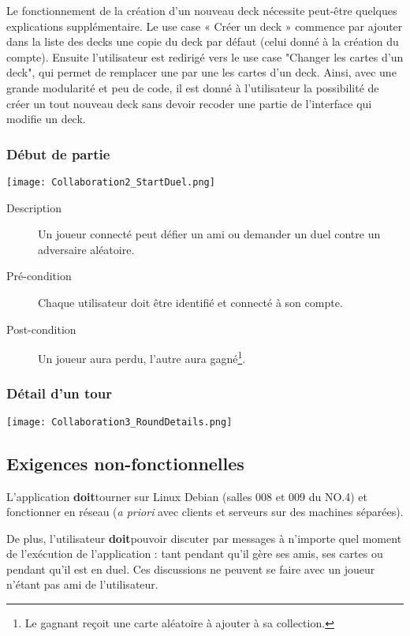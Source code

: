 \documentclass[12pt]{article}
\let\simplesubsection\subsection
\renewcommand{\subsection}{
	\needspace{0.5\pagetotal}
	\simplesubsection
}
\newcommand{\doit}{\textbf{doit}}
\begin{document}
			Le fonctionnement de la création d'un nouveau \gls{deck} nécessite peut-être quelques explications
			supplémentaire. 
			Le use case « Créer un \gls{deck} » commence par ajouter dans la liste des \glspl{deck}
			une copie du \gls{deck} par défaut (celui donné à la création du compte). Ensuite l'utilisateur
			est redirigé vers le use case "Changer les cartes d'un \gls{deck}", qui permet de remplacer
			une par une les cartes d'un \gls{deck}. 
			Ainsi, avec une grande modularité et peu de code,
			il est donné à l'utilisateur la possibilité de créer un tout nouveau \gls{deck} sans devoir recoder une partie
			de l'interface qui modifie un \gls{deck}.

		\subsubsection{Début de partie}
			\begin{center}\texttt{[image: Collaboration2\_StartDuel.png]}\end{center}

			\begin{description}
				\item[Description] Un joueur connecté peut défier un ami ou demander un \gls{duel} contre un adversaire aléatoire.
				\item[Pré-condition] Chaque utilisateur doit être identifié et connecté à son compte.
				\item[Post-condition] Un joueur aura perdu, l'autre aura gagné\footnote{Le gagnant reçoit une carte aléatoire à ajouter à sa collection.}.
			\end{description}

		\subsubsection{Détail d'un tour}
			\begin{center}\texttt{[image: Collaboration3\_RoundDetails.png]}\end{center}

	\subsection{Exigences non-fonctionnelles}
		L'application \doit tourner sur Linux Debian (salles 008 et 009 du NO.4) et fonctionner en réseau (\textit{a priori} avec clients
		et serveurs sur des machines séparées).

		De plus, l'utilisateur \doit pouvoir discuter par messages à n'importe quel moment de l'exécution de l'application : tant pendant
		qu'il gère ses amis, ses cartes ou pendant qu'il est en \gls{duel}. Ces discussions ne peuvent se faire avec un joueur
		n'étant pas ami de l'utilisateur.
\end{document}

